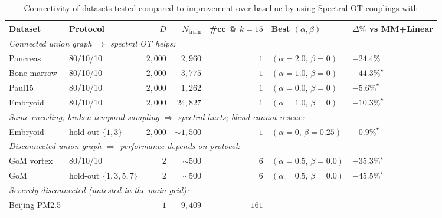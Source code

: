 \begin{table}[t]
\centering
\caption{Connectivity of datasets tested compared to improvement over baseline by using Spectral OT couplings with \ourmodel}
\label{tab:connectivity_outcome}
\renewcommand{\arraystretch}{1.18}
\setlength{\tabcolsep}{5pt}
\begin{tabular}{llrrrll}
\toprule
Dataset & Protocol & $D$ & $N_{\text{train}}$ & \#cc @ $k{=}15$ & Best $(\alpha,\beta)$ & $\Delta\%$ vs MM+Linear \\
\midrule
\multicolumn{7}{l}{\emph{Connected union graph $\Rightarrow$ spectral OT helps:}} \\
Pancreas      & 80/10/10                   & $2{,}000$ & $2{,}960$  & $1$ & $(\alpha{=}2.0,\,\beta{=}0)$    & $-24.4\%$         \\
Bone marrow   & 80/10/10                   & $2{,}000$ & $3{,}775$  & $1$ & $(\alpha{=}1.0,\,\beta{=}0)$    & $-44.3\%^{\star}$ \\
Paul15        & 80/10/10                   & $2{,}000$ & $1{,}262$  & $1$ & $(\alpha{=}0.0,\,\beta{=}0)$    & $-5.6\%^{\star}$  \\
Embryoid      & 80/10/10                   & $2{,}000$ & $24{,}827$ & $1$ & $(\alpha{=}1.0,\,\beta{=}0)$    & $-10.3\%^{\star}$ \\
\midrule
\multicolumn{7}{l}{\emph{Same encoding, broken temporal sampling $\Rightarrow$ spectral hurts; blend cannot rescue:}} \\
Embryoid      & hold-out $\{1,3\}$      & $2{,}000$ & $\sim\!1{,}500$ & $1$ & $(\alpha{=}0,\,\beta{=}0.25)$  & $-0.9\%^{\star}$  \\
\midrule
\multicolumn{7}{l}{\emph{Disconnected union graph $\Rightarrow$ performance depends on protocol:}} \\
GoM vortex    & 80/10/10                   & $2$       & $\sim\!500$    & $6$ & $(\alpha{=}0.5,\,\beta{=}0.0)$ & $-35.3\%^{\star}$ \\
GoM           & hold-out $\{1,3,5,7\}$  & $2$       & $\sim\!500$    & $6$ & $(\alpha{=}0.5,\,\beta{=}0.0)$ & $-45.5\%^{\star}$ \\
\midrule
\multicolumn{7}{l}{\emph{Severely disconnected (untested in the main grid):}} \\
Beijing PM2.5 & ---                        & $1$       & $9{,}409$      & $161$ & --- & ---                                \\
\bottomrule
\end{tabular}
\end{table}
